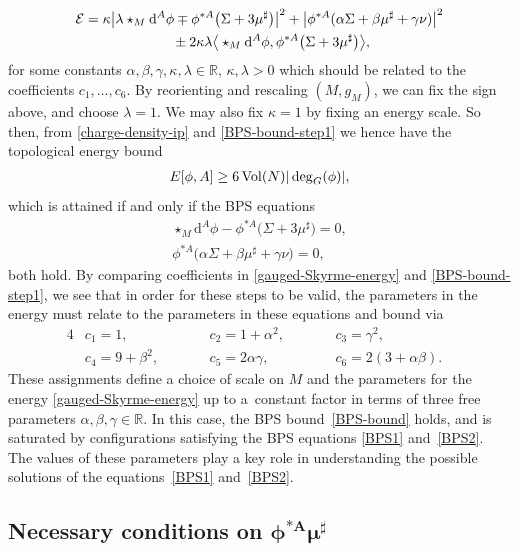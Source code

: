 \documentclass[10pt,a4paper]{amsart}
\newcommand{\EE}{{\mathcal{E}}}
\newcommand{\R}{{\mathbb{R}}}
\newcommand{\1}{{\mathbb{1}}}
\def \d{\mathrm{d}}
\numberwithin{equation}{section}
\begin{document}
\begin{gather}\label{BPS-bound-step1}
\EE=\kappa\big|\lambda\star_{M}\d^A\phi\mp\phi^{\ast A}\big(\Sigma+3\mu^\sharp\big)\big|^2
 +\big|\phi^{\ast A}(\alpha\Sigma+\beta\mu^\sharp+\gamma\nu)\big|^2\\\nonumber
 \hphantom{\EE=}{}\pm2\kappa\lambda\big\langle \star_{M}\d^A\phi,\phi^{\ast A}\big(\Sigma+3\mu^\sharp\big)\big\rangle ,
\end{gather}
for some constants $\alpha, \beta, \gamma, \kappa, \lambda\in\R$, $\kappa, \lambda>0$ which should be related to the coefficients $c_1,\dots,c_6$. By reorienting and rescaling $(M,g_M)$, we can fix the sign above, and choose $\lambda=1$. We may also fix $\kappa=1$ by fixing an energy scale. So then, from \eqref{charge-density-ip} and \eqref{BPS-bound-step1} we hence have the topological energy bound
\begin{align}
 E[\phi,A]\geq6\,{\rm Vol}(N) |\deg_G(\phi) |,\label{BPS-bound}
\end{align}
which is attained if and only if the BPS equations
\begin{gather}
 \star_{M}\d^A\phi-\phi^{\ast A}\big(\Sigma+3\mu^\sharp\big)=0,\label{BPS1}\\
 \phi^{\ast A}\big(\alpha\Sigma+\beta\mu^\sharp+\gamma\nu\big)=0,\label{BPS2}
\end{gather}
both hold. By comparing coefficients in \eqref{gauged-Skyrme-energy} and \eqref{BPS-bound-step1}, we see that in order for these steps to be valid, the parameters in the energy must relate to the parameters in these equations and bound via{\samepage
\begin{alignat}{4}
 & c_1=1,\qquad && c_2=1+\alpha^2,\qquad&& c_3 =\gamma^2,&\nonumber\\
 & c_4=9+\beta^2,\qquad && c_5 =2\alpha\gamma,\qquad&& c_6 =2(3+\alpha\beta).& \label{parameter-matching}
 \end{alignat}}%
These assignments define a choice of scale on $M$ and the parameters for the energy \eqref{gauged-Skyrme-energy} up to a~constant factor in terms of three free parameters $\alpha, \beta,\gamma\in\R$. In this case, the BPS bound~\eqref{BPS-bound} holds, and is saturated by configurations satisfying the BPS equations \eqref{BPS1} and~\eqref{BPS2}.
The values of these parameters play a key role in understanding the possible solutions of the equations~\eqref{BPS1} and~\eqref{BPS2}.

\subsection[Necessary conditions on the pullback of the moment map]{Necessary conditions on $\boldsymbol{\phi^{\ast A}\mu^\sharp}$}\label{sec:nec-cond-BPS1}
\end{document}
